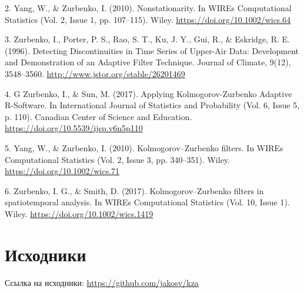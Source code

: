 2. Yang, W., & Zurbenko, I. (2010). Nonstationarity. In WIREs Computational Statistics (Vol. 2, Issue 1, pp. 107–115). Wiley. \url{https://doi.org/10.1002/wics.64}

3. Zurbenko, I., Porter, P. S., Rao, S. T., Ku, J. Y., Gui, R., & Eskridge, R. E. (1996). Detecting Discontinuities in Time Series of Upper-Air Data: Development and Demonstration of an Adaptive Filter Technique. Journal of Climate, 9(12), 3548–3560. \url{http://www.jstor.org/stable/26201469}

4. G Zurbenko, I., & Sun, M. (2017). Applying Kolmogorov-Zurbenko Adaptive R-Software. In International Journal of Statistics and Probability (Vol. 6, Issue 5, p. 110). Canadian Center of Science and Education. \url{https://doi.org/10.5539/ijsp.v6n5p110}

5. Yang, W., & Zurbenko, I. (2010). Kolmogorov–Zurbenko filters. In WIREs Computational Statistics (Vol. 2, Issue 3, pp. 340–351). Wiley. \url{https://doi.org/10.1002/wics.71}

6. Zurbenko, I. G., & Smith, D. (2017). Kolmogorov–Zurbenko filters in spatiotemporal analysis. In WIREs Computational Statistics (Vol. 10, Issue 1). Wiley. \url{https://doi.org/10.1002/wics.1419}

\newpage
\section*{\centering Исходники}

Ссылка на исходники: \url{https://github.com/jakosv/kza}





